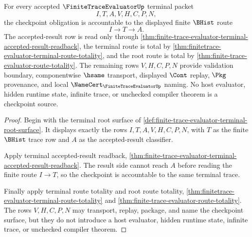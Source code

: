 \begin{theorem}
\label{thm:finite-trace-evaluator-terminal-checkpoint-accountability}
For every accepted $\FiniteTraceEvaluatorUp$ terminal packet
$$
I,T,A,V,H,C,P,N,
$$
the checkpoint obligation is accountable to the displayed finite $\BHist$ route
$$
I \to T \to A.
$$
The accepted-result row is read only through \autoref{thm:finite-trace-evaluator-terminal-accepted-result-readback}, the terminal route is total by \autoref{thm:finitetrace-evaluator-terminal-route-totality}, and the root route is total by \autoref{thm:finite-trace-evaluator-route-totality}. The remaining rows $V,H,C,P,N$ provide validation boundary, componentwise $\hsame$ transport, displayed $\Cont$ replay, $\Pkg$ provenance, and local $\NameCert_{\FiniteTraceEvaluatorUp}$ naming. No host evaluator, hidden runtime state, infinite trace, or unchecked compiler theorem is a checkpoint source.
\end{theorem}
\begin{proof}
Begin with the terminal root surface of \autoref{def:finite-trace-evaluator-terminal-root-surface}. It displays exactly the rows $I,T,A,V,H,C,P,N$, with $T$ as the finite $\BHist$ trace row and $A$ as the accepted-result classifier.

Apply terminal accepted-result readback, \autoref{thm:finite-trace-evaluator-terminal-accepted-result-readback}. The result side cannot reach $A$ before reading the finite route $I \to T$, so the checkpoint is accountable to the same terminal trace.

Finally apply terminal route totality and root route totality, \autoref{thm:finitetrace-evaluator-terminal-route-totality} and \autoref{thm:finite-trace-evaluator-route-totality}. The rows $V,H,C,P,N$ may transport, replay, package, and name the checkpoint surface, but they do not introduce a host evaluator, hidden runtime state, infinite trace, or unchecked compiler theorem.
\end{proof}

